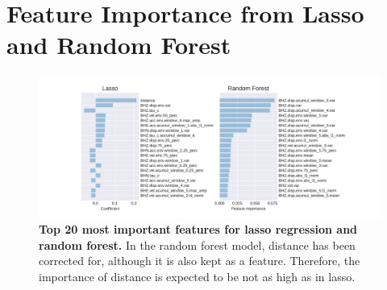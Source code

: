 \documentclass{article} %
\begin{document}

\newpage
\appendix

\section{Feature Importance from Lasso and Random Forest}
\begin{figure}[ht!]
	\centering
	\includegraphics*[scale=0.5, viewport= 12mm 0mm 500mm 120mm, angle=0]{./figure/Feature_importance_lasso_RF.pdf}
	\caption{{\bf Top 20 most important features for lasso regression and random forest.} In the random forest model, distance has been corrected for, although it is also kept as a feature. Therefore, the importance of distance is expected to be not as high as in lasso.}\label{Feature_importance_lasso_RF} 
\end{figure}



\end{document}
